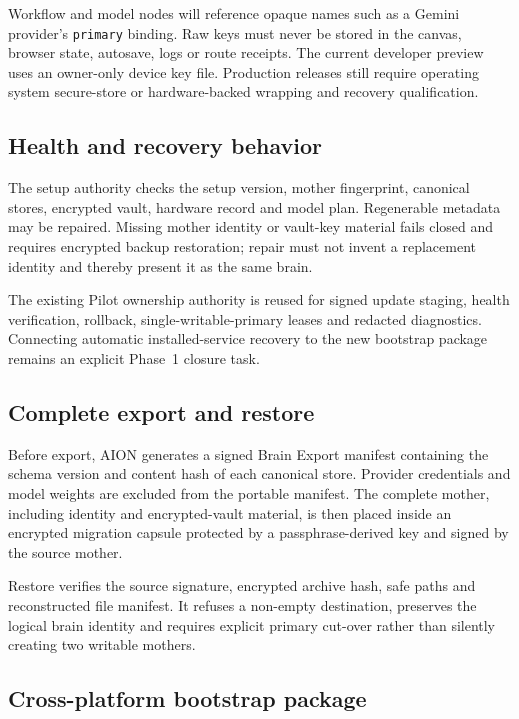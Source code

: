 Workflow and model nodes will reference opaque names such as a Gemini provider's
\texttt{primary} binding.  Raw keys must never be stored in the canvas,
browser state, autosave, logs or route receipts.  The current developer preview
uses an owner-only device key file.  Production releases still require operating
system secure-store or hardware-backed wrapping and recovery qualification.

\subsection{Health and recovery behavior}

The setup authority checks the setup version, mother fingerprint, canonical
stores, encrypted vault, hardware record and model plan.  Regenerable metadata
may be repaired.  Missing mother identity or vault-key material fails closed and
requires encrypted backup restoration; repair must not invent a replacement
identity and thereby present it as the same brain.

The existing Pilot ownership authority is reused for signed update staging,
health verification, rollback, single-writable-primary leases and redacted
diagnostics.  Connecting automatic installed-service recovery to the new
bootstrap package remains an explicit Phase~1 closure task.

\subsection{Complete export and restore}

Before export, AION generates a signed Brain Export manifest containing the
schema version and content hash of each canonical store.  Provider credentials
and model weights are excluded from the portable manifest.  The complete mother,
including identity and encrypted-vault material, is then placed inside an
encrypted migration capsule protected by a passphrase-derived key and signed by
the source mother.

Restore verifies the source signature, encrypted archive hash, safe paths and
reconstructed file manifest.  It refuses a non-empty destination, preserves the
logical brain identity and requires explicit primary cut-over rather than
silently creating two writable mothers.

\subsection{Cross-platform bootstrap package}

